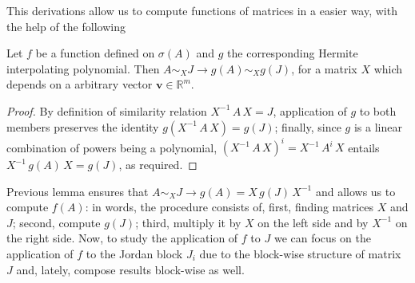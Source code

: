 This derivations allow us to compute functions of
matrices in a easier way, with the help of the following
\begin{lemma} Let $f$ be a function defined on $\sigma(A)$ and $g$ the
corresponding Hermite interpolating polynomial. Then $ A \sim_{X} J \rightarrow
g(A) \sim_{X} g(J) $, for a matrix $X$ which depends on a arbitrary vector
$\boldsymbol{v}\in\mathbb{R}^{m}$.
\end{lemma}
\begin{proof}
By definition of similarity relation $ X^{-1}\,A\,X = J$, application of $g$ to
both members preserves the identity $ g(X^{-1}\,A\,X) = g(J)$; finally, since
$g$ is a linear combination of powers being a polynomial,
$\left(X^{-1}\,A\,X\right)^{i} = X^{-1}\,A^{i}\,X$ entails $X^{-1}\,g(A)\,X =
g(J)$, as required.
\end{proof}
Previous lemma ensures that $A \sim_{X} J\rightarrow g(A) = X\,g(J)\,X^{-1}$
and allows us to compute $f(A)$: in words, the procedure consists of, first,
finding matrices $X$ and $J$; second, compute $g(J)$; third, multiply it by $X$
on the left side and by $X^{-1}$ on the right side. Now, to study the
application of $f$ to $J$ we can focus on the application of $f$ to the Jordan
block $J_{i}$ due to the block-wise structure of matrix $J$ and, lately,
compose results block-wise as well.
\iffalse %
f(J) = \left[ \begin{array}{ccc}
        f(J_{1}) \\
        & \ddots \\
        & & f(J_{\nu}) \\
\end{array} \right] \in\mathbb{R}^{m\times m}
\end{displaymath}
\fi


